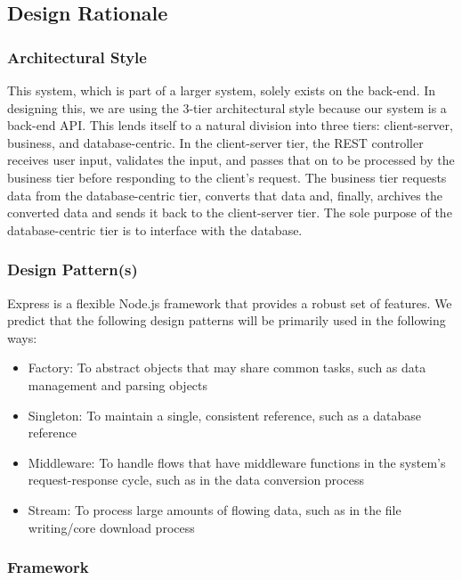 \documentclass{article}
\begin{document}
	\subsection{Design Rationale}
	
	\subsubsection{Architectural Style}
	
	This system, which is part of a larger system, solely exists on the back-end. In designing this, we are using the 3-tier architectural style because our system is a back-end API. This lends itself to a natural division into three tiers: client-server, business, and database-centric. In the client-server tier, the REST controller receives user input, validates the input, and passes that on to be processed by the business tier before responding to the client's request. The business tier requests data from the database-centric tier, converts that data and, finally, archives the converted data and sends it back to the client-server tier. The sole purpose of the database-centric tier is to interface with the database. 
	
	\subsubsection{Design Pattern(s)}
	
	Express is a flexible Node.js framework that provides a robust set of features. We predict that the following design patterns will be primarily used in the following ways: \\
	
	\begin{itemize} 
		\item Factory: To abstract objects that may share common tasks, such as data management and parsing objects
		\item Singleton: To maintain a single, consistent reference, such as a database reference
		\item Middleware: To handle flows that have middleware functions in the system's request-response cycle, such as in the data conversion process
		\item Stream: To process large amounts of flowing data, such as in the file writing/core download process
	\end{itemize}
	
	
	\subsubsection{Framework}
	
\end{document}
